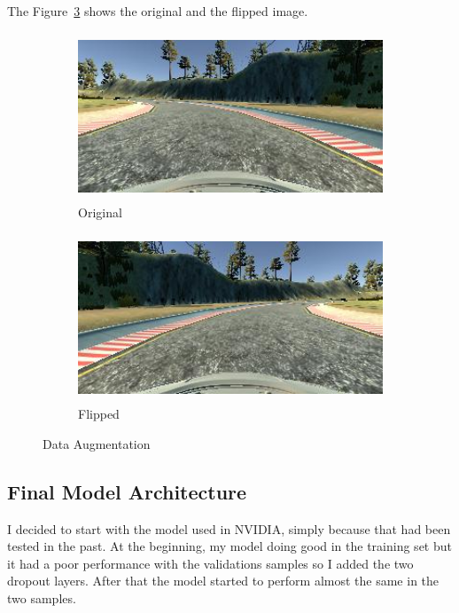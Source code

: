 \documentclass[11pt, a4paper]{article}
\begin{document}
The Figure~\ref{fig:data_augmentation} shows the original and the flipped image.



\begin{figure}[htpb!]
 
\begin{subfigure}{0.5\textwidth}
\includegraphics[width=0.9\linewidth, height=5cm]{original} 
\caption{Original}
\label{fig:original}
\end{subfigure}
\begin{subfigure}{0.5\textwidth}
\includegraphics[width=0.9\linewidth, height=5cm]{flipped}
\caption{Flipped}
\label{fig:subim2}
\end{subfigure}
 
\caption{Data Augmentation}
\label{fig:data_augmentation}
\end{figure}



\subsection{Final Model Architecture}%
\label{sub:final_model_architecture}



I decided to start with the model used in NVIDIA, simply because that had been tested in the past. At the beginning, my model doing good in the training set but it had a poor performance with the validations samples so I added the two dropout layers. After that the model started to perform almost the same in the two samples. 
\end{document}
